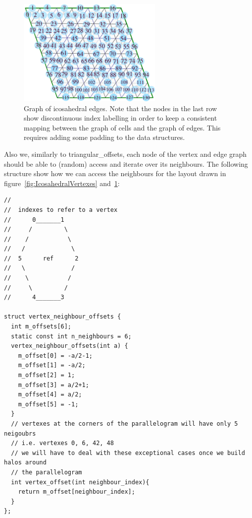 \documentclass{book}
\begin{document}
\begin{figure}[htb!]
	\begin{center}
		\includegraphics[width=7cm]{IcosahedralGridEdges.png}
	\caption{Graph of icosahedral edges. Note that the nodes in the last row
		show discontinuous index labelling in order to keep a consistent mapping between the graph of cells and the graph of edges. This requires adding some padding to the data structures.}
	\label{fig:IcosahedralEdges}
	\end{center}
\end{figure}

Also we, similarly to triangular\_offsets, each node of the vertex and edge graph should be able to (random) access and iterate over its neighbours. 
The following structure show how we can access the neighbours for the layout 
drawn in figure~\ref{fig:IcosahedralVertexes} and~\ref{fig:IcosahedralEdges}:

\begin{verbatim}
//
//  indexes to refer to a vertex
//      0_______1
//     /         \
//    /           \
//   /             \
//  5      ref      2
//   \             /
//    \           /
//     \         /
//      4_______3 

struct vertex_neighbour_offsets {
  int m_offsets[6];
  static const int n_neighbours = 6;
  vertex_neighbour_offsets(int a) {
    m_offset[0] = -a/2-1;
    m_offset[1] = -a/2;
    m_offset[2] = 1;
    m_offset[3] = a/2+1;
    m_offset[4] = a/2;
    m_offset[5] = -1;
  }
  // vertexes at the corners of the parallelogram will have only 5 neigoubrs
  // i.e. vertexes 0, 6, 42, 48 
  // we will have to deal with these exceptional cases once we build halos around
  // the parallelogram
  int vertex_offset(int neighbour_index){
    return m_offset[neighbour_index];
  }
};
\end{verbatim}
\end{document}

